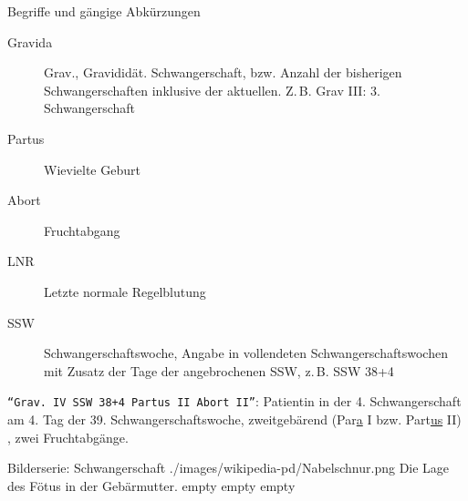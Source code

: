 \Text
{Begriffe und gängige Abkürzungen}
{
\begin{description}
  \item[Gravida]  Grav., Gravididät.
  Schwangerschaft, bzw. Anzahl der bisherigen
  Schwangerschaften inklusive der aktuellen. Z.\,B. Grav
  III: 3. Schwangerschaft
  \item[] 
  \item[Partus] Wievielte Geburt
  \item[Abort] Fruchtabgang
  \item[] 
  \item[LNR]  Letzte normale Regelblutung
  \item[SSW] Schwangerschaftswoche, Angabe in vollendeten
  Schwangerschaftswochen mit Zusatz der Tage der
  angebrochenen SSW, z.\,B. SSW 38+4
\end{description}


\texttt{\enquote{Grav. IV SSW 38+4
Partus II Abort II}}: Patientin in der 4. Schwangerschaft am
4.
Tag der 39. Schwangerschaftswoche, zweitgebärend (Par\underline{a} I bzw. Part\underline{us} II) , zwei Fruchtabgänge.

}
{}
{}
{}
{}

\begin{PictureSeriesWide}{}{Bilderserie: Schwangerschaft}
{./images/wikipedia-pd/Nabelschnur.png}
{Die Lage des Fötus in der Gebärmutter.
}
{empty}
{}
{empty}
{}
{empty}
{}
\end{PictureSeriesWide}
















\clearpage

\section{}




